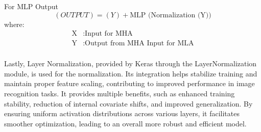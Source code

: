 For MLP Output
\[(OUTPUT) = (Y)+\text{MLP (Normalization (Y))}\] 
where:
\begin{align*}
    \text{X} & : \text{Input for MHA} \\
    \text{Y} & : \text{Output from MHA Input for MLA} \\
\end{align*}

Lastly, Layer Normalization, provided by Keras through the LayerNormalization module, is used for the normalization. Its integration helps stabilize training and maintain proper feature scaling, contributing to improved performance in image recognition tasks. It provides multiple benefits, such as enhanced training stability, reduction of internal covariate shifts, and improved generalization. By ensuring uniform activation distributions across various layers, it facilitates smoother optimization, leading to an overall more robust and efficient model.

\newpage